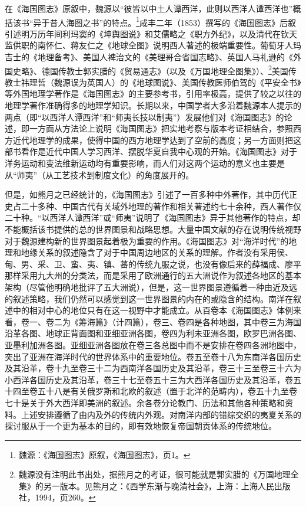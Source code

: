 \documentclass[a4paper, 12pt, openright]{ctexbook}
\begin{document}
在《海国图志》原叙中，魏源以“彼皆以中土人谭西洋，此则以西洋人谭西洋也”概括该书“异于昔人海图之书”的特点。\footnote{魏源：《海国图志》原叙，《海国图志》，页1。}咸丰二年（1853）撰写的《海国图志》后叙引述明万历年间利玛窦的《坤舆图说》和艾儒略之《职方外纪》，以及清代在钦天监供职的南怀仁、蒋友仁之《地球全图》说明西人著述的极端重要性。葡萄牙人玛吉士的《地理备考》、美国人裨治文的《美理哥合省国志略》、英国人马礼逊的《外国史略》、德国传教士郭实腊的《贸易通志》（以及《万国地理全图集》）、\footnote{魏源没有注明此书出处，据熊月之的考证，很可能就是郭实腊的《万国地理全集》的另一版本。见熊月之：《西学东渐与晚清社会》，上海：上海人民出版社，1994，页260。}美国传教士祎理哲（魏源误为英国人）的《地球图说》、美国传教医师伯驾的《平安全书》等外国地理学著作是《海国图志》的主要参考书，引用率极高，提供了较之以往的地理学著作准确得多的地理学知识。长期以来，中国学者大多沿着魏源本人提示的两点（即“以西洋人谭西洋”和“师夷长技以制夷”）发展他们对《海国图志》的论述，即一方面从方法论上说明《海国图志》把实地考察与版本考证相结合，参照西方近代地理学的成果，使得中国的西方地理学达到了空前的高度；另一方面则把这部书看作是近代中国人学习西洋、摆脱华夏自我中心观的开始。《海国图志》对于洋务运动和变法维新运动均有重要影响，而人们对这两个运动的意义也主要是从“师夷”（从工艺技术到制度文化）的角度展开的。

但是，如熊月之已经统计的，《海国图志》引述了一百多种中外著作，其中历代正史占二十多种、中国古代有关域外地理的著作和相关著述约七十余种，西人著作仅二十种。“以西洋人谭西洋”或“师夷”说明了《海国图志》异于其他著作的特点，却不能概括该书提供的总的世界图景和战略思想。大量中国文献的存在说明传统视野对于魏源建构新的世界图景起着极为重要的作用。《海国图志》对“海洋时代”的地理和地缘关系的叙述隐含了对于中国周边地区的关系的理解。作者没有采用侯、甸、男、采、卫、蛮、夷、镇、蕃的传统九服之说，也没有像后来的薛福成、廖平那样采用九大州的分类法，而是采用了欧洲通行的五大洲说作为叙述各地区的基本架构（尽管他明确地批评了五大洲说），但是，这一世界图景遵循着一种由近及远的叙述策略，我们仍然可以感觉到这一世界图景的内在的或隐含的结构。南洋在叙述中的相对中心的地位只有在这一视野中才能成立。从百卷本《海国图志》体例来看，卷一、卷二为《筹海篇》（计四篇），卷三、卷四是各种地图，其中卷三为海国沿革各图、地球正背面图和亚细亚洲各图，卷四为利未亚洲各图，欧罗巴洲各图、亚墨利加洲各图。亚细亚洲各图放在卷三各总图中而不是安排在卷四各洲地图中，突出了亚洲在海洋时代的世界体系中的重要地位。卷五至卷十八为东南洋各国历史及其沿革，卷十九至卷三十二为西南洋各国历史及其沿革，卷三十三至卷三十六为小西洋各国历史及其沿革，卷三十七至卷五十三为大西洋各国历史及其沿革，卷五十四至卷五十八是有关俄罗斯和北欧的叙述（置于北洋的范畴内），卷五十九至卷七十是关于外大西洋即美洲的叙述。余各卷分论教门、历法和其他各种策略和资料。上述安排遵循了由内及外的传统内外观。对南洋内部的错综交织的夷夏关系的探讨服从于一个更为基本的目的，即有效地恢复帝国朝贡体系的传统地位。
\end{document}
